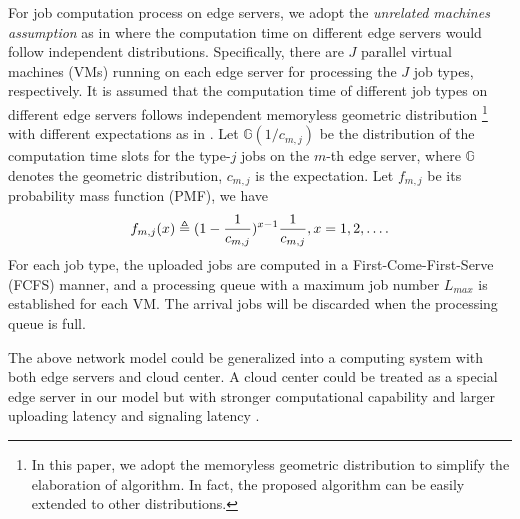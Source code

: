 For job computation process on edge servers, we adopt the \emph{unrelated machines assumption} as in \cite{tan-online} where the computation time on different edge servers would follow independent distributions.
Specifically, there are $J$ parallel virtual machines (VMs) running on each edge server for processing the $J$ job types, respectively.
It is assumed that the computation time of different job types on different edge servers follows independent memoryless geometric distribution 
\footnote{In this paper, we adopt the memoryless geometric distribution to simplify the elaboration of algorithm. In fact, the proposed algorithm can be easily extended to other distributions.}
with different expectations as in \cite{TOWC18-HuangKb}.
Let $\mathbb{G}(1/c_{m,j})$ be the distribution of the computation time slots for the type-$j$ jobs on the $m$-th edge server, where $\mathbb{G}$ denotes the geometric distribution, $c_{m,j}$ is the expectation.
Let $f_{m,j}$ be its probability mass function (PMF), we have
\begin{align}
    f_{m,j}(x) \triangleq (1-\frac{1}{c_{m,j}})^{x-1} \frac{1}{c_{m,j}}, x=1,2,\dots.
\end{align}
For each job type, the uploaded jobs are computed in a First-Come-First-Serve (FCFS) manner, and a processing queue with a maximum job number $L_{max}$ is established for each VM.
The arrival jobs will be discarded when the processing queue is full.

\begin{remark}%
    The above network model could be generalized into a computing system with both edge servers and cloud center.
    A cloud center could be treated as a special edge server in our model but with stronger computational capability and larger uploading latency and signaling latency .
\end{remark}

